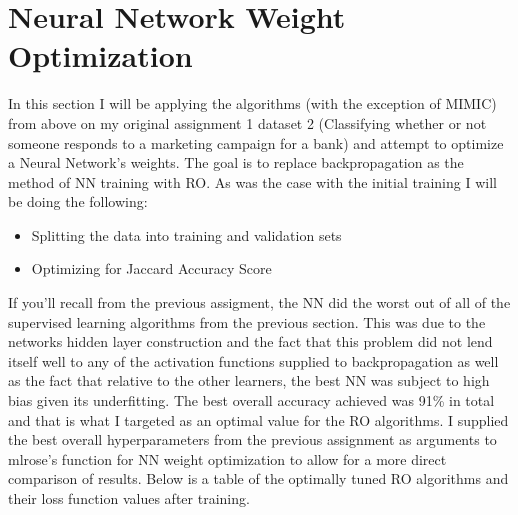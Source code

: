 \documentclass[11pt]{article}
\begin{document}
    \section{Neural Network Weight Optimization}
    In this section I will be applying the algorithms (with the exception of MIMIC) from above on my original assignment 1 dataset 2 (Classifying whether
    or not someone responds to a marketing campaign for a bank) and attempt to optimize a Neural Network's weights.
    The goal is to replace backpropagation as the method of NN training with RO\@.
    As was the case with the initial training I will be doing the following:
    \begin{itemize}
        \item Splitting the data into training and validation sets
        \item Optimizing for Jaccard Accuracy Score\cite{wikipedia_2021}
    \end{itemize}
    If you'll recall from the previous assigment, the NN did the worst out of all of the supervised learning algorithms from
    the previous section.
    This was due to the networks hidden layer construction and the fact that this problem did not lend itself well to any
    of the activation functions supplied to backpropagation as well as the fact that relative to the other learners, the
    best NN was subject to high bias given its underfitting.
    The best overall accuracy achieved was 91\% in total and that is what I targeted as an optimal value for the RO algorithms.
    I supplied the best overall hyperparameters from the previous assignment as arguments to mlrose's function for NN weight optimization
    to allow for a more direct comparison of results.
    Below is a table of the optimally tuned RO algorithms and their loss function values after training.
\end{document}
